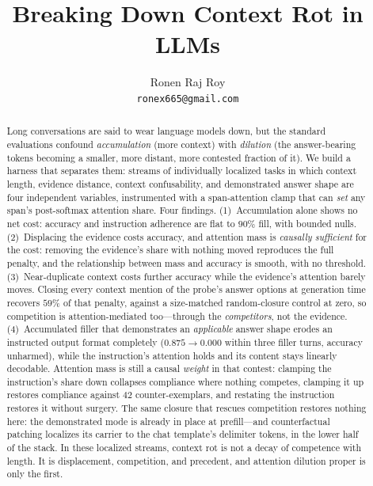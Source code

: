 \documentclass{article}
\title{Breaking Down Context Rot in LLMs}
\author{%
  Ronen Raj Roy\\
  \texttt{ronex665@gmail.com}\\
}
\begin{document}
\maketitle

\begin{abstract}
Long conversations are said to wear language models down, but the standard evaluations confound
\emph{accumulation} (more context) with \emph{dilution} (the answer-bearing tokens becoming a
smaller, more distant, more contested fraction of it). We build a harness that separates them:
streams of individually localized tasks in which context length, evidence distance, context
confusability, and demonstrated answer shape are four independent variables, instrumented with a
span-attention clamp that can \emph{set} any span's post-softmax attention share. Four findings.
(1)~Accumulation alone shows no net cost: accuracy and instruction adherence are flat to $90\%$
fill, with bounded nulls. (2)~Displacing the evidence costs accuracy, and attention mass is
\emph{causally sufficient} for the cost: removing the evidence's share with nothing moved
reproduces the full penalty, and the relationship between mass and accuracy is smooth, with no
threshold. (3)~Near-duplicate context costs further accuracy while the evidence's attention
barely moves. Closing every context mention of the probe's answer options at generation time
recovers $59\%$ of that penalty, against a size-matched random-closure control at zero, so
competition is attention-mediated too---through the \emph{competitors}, not the evidence.
(4)~Accumulated filler that demonstrates an \emph{applicable} answer shape erodes an instructed
output format completely ($0.875\to0.000$ within three filler turns, accuracy unharmed), while
the instruction's attention holds and its content stays linearly decodable. Attention mass is
still a causal \emph{weight} in that contest: clamping the instruction's share down collapses
compliance where nothing competes, clamping it up restores compliance against $42$
counter-exemplars, and restating the instruction restores it without surgery. The same closure
that rescues competition restores nothing here: the demonstrated mode is already in place at
prefill---and counterfactual patching localizes its carrier to the chat template's delimiter
tokens, in the lower half of the stack.
In these localized streams,
context rot is not a decay of competence with length. It is displacement, competition, and
precedent, and attention dilution proper is only the first.
\end{abstract}
\end{document}
